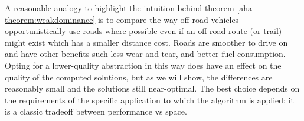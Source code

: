 \par \indent
A reasonable analogy to highlight the intuition behind theorem \ref{aha-theorem:weakdominance} is to compare the way off-road vehicles opportunistically use roads where possible even if an off-road route (or trail) might exist which has a smaller distance cost. Roads are smoother to drive on and have other benefits such less wear and tear, and better fuel consumption. Opting for a lower-quality abstraction in this way does have an effect on the quality of the computed solutions, but as we will show, the differences are reasonably small and the solutions still near-optimal. The best choice depends on the requirements of the specific application to which the algorithm is applied; it is a classic tradeoff between performance vs space.
\par \indent


